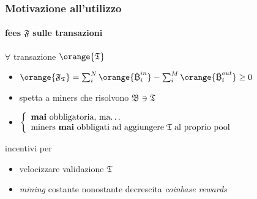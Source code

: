 \begin{frame}
	\frametitle{Motivazione all'utilizzo}
		\framesubtitle{fees $\mathfrak{F}$ sulle transazioni}
		
		$\forall$ transazione $\orange{\mathfrak{T}}$
		\begin{itemize}
			\item $\orange{\mathfrak{F}_\mathfrak{T}} = \sum_i^N \orange{\bitcoinA_i^{in}} - \sum_i^M \orange{\bitcoinA_i^{out}} \geq 0$
			\item spetta a miners che risolvono $\mathfrak{B}\ni\mathfrak{T}$
			\item $ \left \{
					  \begin{array}{lcr}
					    \text{\textbf{mai} obbligatoria, ma\ldots}\\ %
					    \text{miners \textbf{mai} obbligati ad aggiungere}\;\mathfrak{T}\;\text{al proprio pool}  %
					  \end{array}
					\right. $  
		\end{itemize}
		\vspace{5pt}
		{\color{blue}incentivi} per
		\begin{itemize}
			\item velocizzare validazione $\mathfrak{T}$
			\item \textit{mining} costante nonostante decrescita \textit{coinbase rewards}
		\end{itemize}

\end{frame}